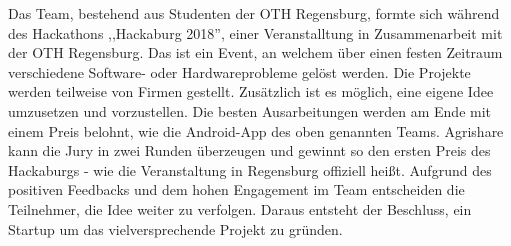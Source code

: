 Das Team, bestehend aus Studenten der OTH Regensburg, formte sich während des Hackathons ,,Hackaburg 2018'', einer Veranstalltung in Zusammenarbeit mit der OTH Regensburg. Das ist ein Event, an welchem über einen festen Zeitraum verschiedene Software- oder Hardwareprobleme gelöst werden. Die Projekte werden teilweise von Firmen gestellt. Zusätzlich ist es möglich, eine eigene Idee umzusetzen und vorzustellen. Die besten Ausarbeitungen werden am Ende mit einem Preis belohnt, wie die Android-App des oben genannten Teams. Agrishare kann die Jury in zwei Runden überzeugen und gewinnt so den ersten Preis des Hackaburgs - wie die Veranstaltung in Regensburg offiziell heißt. Aufgrund des positiven Feedbacks und dem hohen Engagement im Team entscheiden die Teilnehmer, die Idee weiter zu verfolgen. Daraus entsteht der Beschluss, ein Startup um das vielversprechende Projekt zu gründen.


